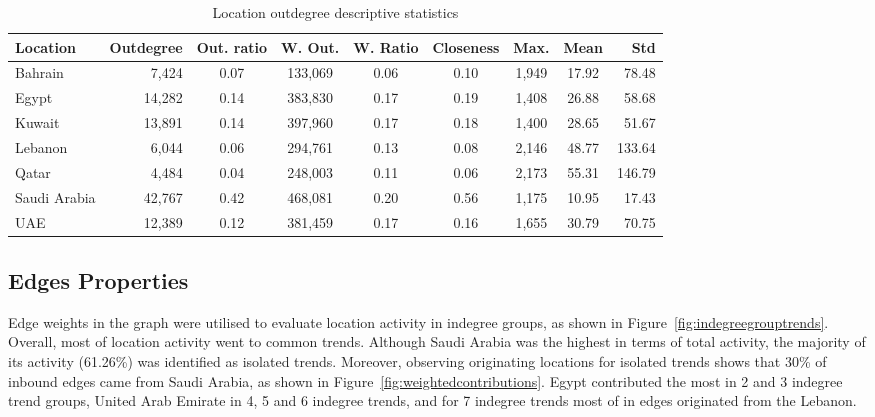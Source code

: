 \documentclass{llncs}
\begin{document}
\begin{table}[!h]
\centering
\caption{Location outdegree descriptive statistics}
\begin{tabular}{@{}lrccccccr@{}}
\toprule
Location & Outdegree & Out. ratio & W. Out. & W. Ratio & Closeness & Max. &  Mean & Std \\ 
\midrule
Bahrain &           7,424 & 0.07 & 133,069 & 0.06 & 0.10 & 1,949 & 17.92 &   78.48\\
Egypt &            14,282 & 0.14 & 383,830 & 0.17 & 0.19 & 1,408 & 26.88 &   58.68\\
Kuwait &          13,891 & 0.14 & 397,960 & 0.17 & 0.18 & 1,400 & 28.65 &   51.67\\
Lebanon &         6,044 & 0.06 & 294,761 & 0.13 & 0.08 & 2,146 & 48.77 & 133.64\\
Qatar &              4,484 & 0.04 & 248,003 & 0.11 & 0.06 & 2,173 & 55.31 & 146.79\\
Saudi Arabia & 42,767 & 0.42 & 468,081 & 0.20 & 0.56 & 1,175 & 10.95 &   17.43\\
UAE &              12,389 & 0.12 & 381,459 & 0.17 & 0.16 & 1,655 & 30.79 &   70.75\\
\bottomrule
\end{tabular}
\label{tbl:locationoutdegree}
\end{table}

\subsection{Edges Properties}

Edge weights in the graph were utilised to evaluate location activity
in indegree groups, as shown in
Figure~\ref{fig:indegreegrouptrends}. Overall, most of location
activity went to common trends. Although Saudi Arabia was the highest
in terms of total activity, the majority of its activity (61.26\%) was
identified as isolated trends. Moreover, observing originating locations
for isolated trends shows that 30\% of inbound edges came from Saudi
Arabia, as shown in Figure~\ref{fig:weightedcontributions}. Egypt
contributed the most in 2 and 3 indegree trend groups, United Arab
Emirate in 4, 5 and 6 indegree trends, and for 7 indegree trends most
of in edges originated from the Lebanon.
\end{document}
